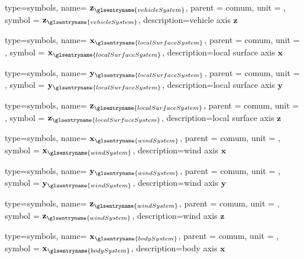 {type=symbols,
  name= \ensuremath{\mathbf{z}_{\glsentryname{vehicleSystem}}},
  parent = {comum},
  unit = \unexpanded{},
  symbol = \ensuremath{\mathbf{z}_{\glsentryname{vehicleSystem}}},
  description={vehicle axis $\mathbf{z}$}
}




{type=symbols,
  name= \ensuremath{\mathbf{x}_{\glsentryname{localSurfaceSystem}}},
  parent = {comum},
  unit = \unexpanded{},
  symbol = \ensuremath{\mathbf{x}_{\glsentryname{localSurfaceSystem}}},
  description={local surface axis $\mathbf{x}$}
}

{type=symbols,
  name= \ensuremath{\mathbf{y}_{\glsentryname{localSurfaceSystem}}},
  parent = {comum},
  unit = \unexpanded{},
  symbol = \ensuremath{\mathbf{y}_{\glsentryname{localSurfaceSystem}}},
  description={local surface axis $\mathbf{y}$}
}



{type=symbols,
  name= \ensuremath{\mathbf{z}_{\glsentryname{localSurfaceSystem}}},
  parent = {comum},
  unit = \unexpanded{},
  symbol = \ensuremath{\mathbf{z}_{\glsentryname{localSurfaceSystem}}},
  description={local surface axis $\mathbf{z}$}
}


{type=symbols,
  name= \ensuremath{\mathbf{x}_{\glsentryname{windSystem}}},
  parent = {comum},
  unit = \unexpanded{},
  symbol = \ensuremath{\mathbf{x}_{\glsentryname{windSystem}}},
  description={wind axis $\mathbf{x}$}
}

{type=symbols,
  name= \ensuremath{\mathbf{y}_{\glsentryname{windSystem}}},
  parent = {comum},
  unit = \unexpanded{},
  symbol = \ensuremath{\mathbf{y}_{\glsentryname{windSystem}}},
  description={wind axis $\mathbf{y}$}
}



{type=symbols,
  name= \ensuremath{\mathbf{z}_{\glsentryname{windSystem}}},
  parent = {comum},
  unit = \unexpanded{},
  symbol = \ensuremath{\mathbf{z}_{\glsentryname{windSystem}}},
  description={wind axis $\mathbf{z}$}
}


{type=symbols,
  name= \ensuremath{\mathbf{x}_{\glsentryname{bodySystem}}},
  parent = {comum},
  unit = \unexpanded{},
  symbol = \ensuremath{\mathbf{x}_{\glsentryname{bodySystem}}},
  description={body axis $\mathbf{x}$}
}

